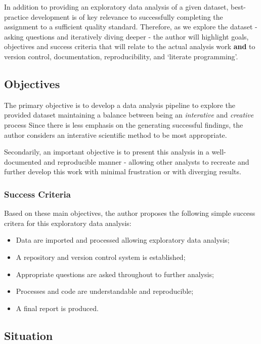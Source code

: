 \documentclass[
]{article}
\begin{document}
In addition to providing an exploratory data analysis of a given
dataset, best-practice development is of key relevance to successfully
completing the assignment to a sufficient quality standard. Therefore,
as we explore the dataset - asking questions and iteratively diving
deeper - the author will highlight goals, objectives and success
criteria that will relate to the actual analysis work \textbf{and} to
version control, documentation, reproducibility, and `literate
programming'.

\hypertarget{objectives}{%
\subsection{Objectives}\label{objectives}}

The primary objective is to develop a data analysis pipeline to explore
the provided dataset maintaining a balance between being an
\emph{interative} and \emph{creative} process Since there is less
emphasis on the generating successful findings, the author considers an
interative scientific method to be most appropriate.

Secondarily, an important objective is to present this analysis in a
well-documented and reproducible manner - allowing other analysts to
recreate and further develop this work with minimal frustration or with
diverging results.

\hypertarget{success-criteria}{%
\subsubsection{Success Criteria}\label{success-criteria}}

Based on these main objectives, the author proposes the following simple
success critera for this exploratory data analysis:

\begin{itemize}
\item
  Data are imported and processed allowing exploratory data analysis;
\item
  A repository and version control system is established;
\item
  Appropriate questions are asked throughout to further analysis;
\item
  Processes and code are understandable and reproducible;
\item
  A final report is produced.
\end{itemize}

\hypertarget{situation}{%
\subsection{Situation}\label{situation}}
\end{document}
